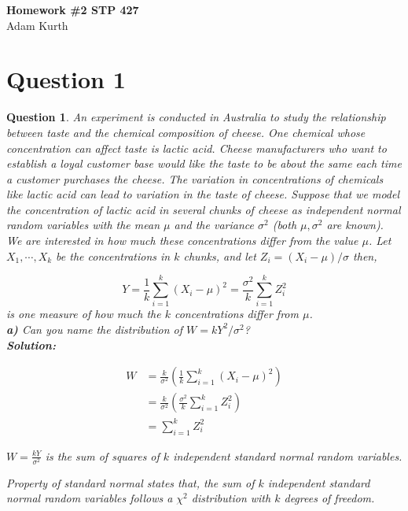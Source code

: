 \documentclass{article}
\theoremstyle{questionstyle}
\newtheorem{myquestion}{Question}
\begin{document}
\begin{center}
    \Large{\textbf{Homework \#2 STP 427}}\\
    Adam Kurth
\end{center}


\section{Question 1}
\begin{myquestion}
    
    An experiment is conducted in Australia to study the relationship between
    taste and the chemical composition of cheese. One chemical whose concentration can affect taste is lactic acid. Cheese manufacturers who want to establish a loyal customer base would like the taste to be about the same each time a customer purchases the cheese. The variation in concentrations of chemicals like lactic acid can lead to variation in the taste of cheese. Suppose that we model the concentration of lactic acid in several chunks of cheese as independent normal random variables with the mean \( \mu \) and the variance \( \sigma^2 \) (both \( \mu, \sigma^2\) are known). We are interested in how much these concentrations differ from the value \( \mu \). Let \( X_1, \cdots , X_k \) be the concentrations in \( k \) chunks, and let \( Z_i = (X_i - \mu )/ \sigma \) then,
    
    \[ Y = \frac{1}{k} \sum_{i=1}^{k}(X_i - \mu)^2  = \frac{\sigma^2}{k} \sum_{i=1}^{k} Z_i^2 \]
    is one measure of how much the \( k \) concentrations differ from \( \mu \).\\
    
\textbf{a)} Can you name the distribution of \( W = kY^2/\sigma^2 \)?\\

\textbf{Solution:}

\begin{align*}
    W &= \frac{k}{\sigma^2} \left( \frac{1}{k} \sum_{i=1}^k  (X_i - \mu)^2 \right)\\
      &= \frac{k}{\sigma^2} \left( \frac{\sigma^2}{k} \sum_{i=1}^k  Z_i^2 \right)\\
      &= \sum_{i=1}^k Z_i^2
\end{align*}

\(W = \frac{kY}{\sigma^2} \) is the sum of squares of \(k\) independent standard normal random variables.

Property of standard normal states that, the sum of \(k\) independent standard normal random variables follows a \(\chi^2\) distribution with \(k\) degrees of freedom. 


\end{myquestion}
\end{document}
